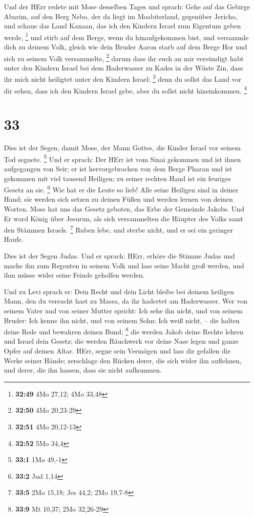  Und der HErr redete mit Mose desselben Tages und sprach:
 Gehe auf das Gebirge Abarim, auf den Berg Nebo, der da
liegt im Moabiterland, gegenüber Jericho, und schaue das Land Kanaan,
das ich den Kindern Israel zum Eigentum geben werde, \footnote{\textbf{32:49}
  4Mo 27,12; 4Mo 33,48}  und stirb auf dem Berge, wenn du
hinaufgekommen bist, und versammle dich zu deinem Volk, gleich wie dein
Bruder Aaron starb auf dem Berge Hor und sich zu seinem Volk
versammelte, \footnote{\textbf{32:50} 4Mo 20,23-29}  darum
dass ihr euch an mir versündigt habt unter den Kindern Israel bei dem
Haderwasser zu Kades in der Wüste Zin, dass ihr mich nicht heiligtet
unter den Kindern Israel; \footnote{\textbf{32:51} 4Mo 20,12-13}
 denn du sollst das Land vor dir sehen, dass ich den
Kindern Israel gebe, aber du sollst nicht hineinkommen. \footnote{\textbf{32:52}
  5Mo 34,4}

\hypertarget{section-10}{%
\section{33}\label{section-10}}

 Dies ist der Segen, damit Mose, der Mann Gottes, die Kinder
Israel vor seinem Tod segnete. \footnote{\textbf{33:1} 1Mo 49,-1}
 Und er sprach: Der HErr ist vom Sinai gekommen und ist
ihnen aufgegangen von Seir; er ist hervorgebrochen von dem Berge Pharan
und ist gekommen mit viel tausend Heiligen; zu seiner rechten Hand ist
ein feuriges Gesetz an sie. \footnote{\textbf{33:2} Jud 1,14}
 Wie hat er die Leute so lieb! Alle seine Heiligen sind in
deiner Hand; sie werden sich setzen zu deinen Füßen und werden lernen
von deinen Worten.  Mose hat uns das Gesetz geboten, das
Erbe der Gemeinde Jakobs.  Und Er ward König über Jesurun,
als sich versammelten die Häupter des Volks samt den Stämmen Israels.
\footnote{\textbf{33:5} 2Mo 15,18; Jes 44,2; 2Mo 19,7-8} 
Ruben lebe, und sterbe nicht, und er sei ein geringer Haufe.

 Dies ist der Segen Judas. Und er sprach: HErr, erhöre die
Stimme Judas und mache ihn zum Regenten in seinem Volk und lass seine
Macht groß werden, und ihm müsse wider seine Feinde geholfen werden.

 Und zu Levi sprach er: Dein Recht und dein Licht bleibe bei
deinem heiligen Mann, den du versucht hast zu Massa, da ihr hadertet am
Haderwasser.  Wer von seinem Vater und von seiner Mutter
spricht: Ich sehe ihn nicht, und von seinem Bruder: Ich kenne ihn nicht,
und von seinem Sohn: Ich weiß nicht, -- die halten deine Rede und
bewahren deinen Bund; \footnote{\textbf{33:9} Mt 10,37; 2Mo 32,26-29}
 die werden Jakob deine Rechte lehren und Israel dein
Gesetz; die werden Räuchwerk vor deine Nase legen und ganze Opfer auf
deinen Altar.  HErr, segne sein Vermögen und lass dir
gefallen die Werke seiner Hände; zerschlage den Rücken derer, die sich
wider ihn auflehnen, und derer, die ihn hassen, dass sie nicht
aufkommen.

